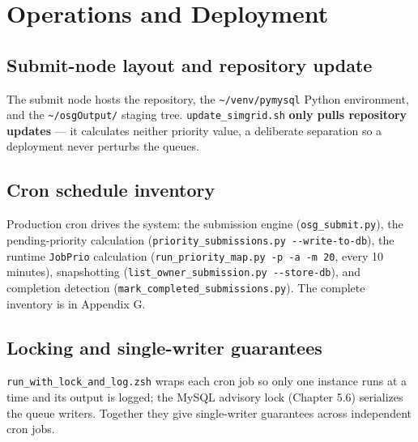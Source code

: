 \section{Operations and Deployment}\label{ch:14}

\subsection{Submit-node layout and repository update}

The submit node hosts the repository, the \texttt{\textasciitilde{}/\allowbreak{}venv/\allowbreak{}pymysql}
Python environment, and the \texttt{\textasciitilde{}/\allowbreak{}osgOutput/\allowbreak{}} staging tree.
\texttt{update\_\allowbreak{}simgrid.\allowbreak{}sh} \textbf{only pulls repository updates} --- it calculates
neither priority value, a deliberate separation so a deployment never perturbs the queues.

\subsection{Cron schedule inventory}

Production cron drives the system: the submission engine (\texttt{osg\_\allowbreak{}submit.\allowbreak{}py}),
the pending-priority calculation (\texttt{priority\_\allowbreak{}submissions.\allowbreak{}py
-\allowbreak{}-\allowbreak{}write-\allowbreak{}to-\allowbreak{}db}), the runtime \texttt{JobPrio} calculation
(\texttt{run\_\allowbreak{}priority\_\allowbreak{}map.\allowbreak{}py -\allowbreak{}p -\allowbreak{}a
-\allowbreak{}m 20}, every 10 minutes), snapshotting
(\texttt{list\_\allowbreak{}owner\_\allowbreak{}submission.\allowbreak{}py
-\allowbreak{}-\allowbreak{}store-\allowbreak{}db}), and completion detection
(\texttt{mark\_\allowbreak{}completed\_\allowbreak{}submissions.\allowbreak{}py}). The complete inventory is in
Appendix G.

\subsection{Locking and single-writer guarantees}

\texttt{run\_\allowbreak{}with\_\allowbreak{}lock\_\allowbreak{}and\_\allowbreak{}log.\allowbreak{}zsh} wraps
each cron job so only one instance runs at a time and its output is logged; the MySQL advisory lock (Chapter
5.6) serializes the queue writers. Together they give single-writer guarantees across independent cron jobs.

